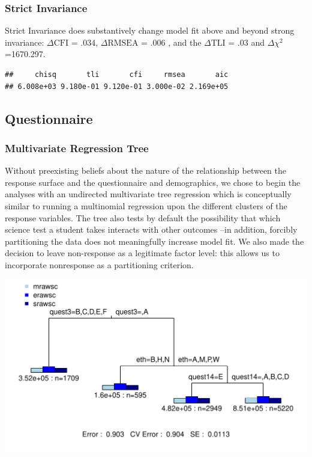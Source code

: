 \documentclass{article}\usepackage[]{graphicx}\usepackage[]{color}
\makeatletter
\def\maxwidth{ %
  \ifdim\Gin@nat@width>\linewidth
    \linewidth
  \else
    \Gin@nat@width
  \fi
}
\newenvironment{kframe}{%
 \def\at@end@of@kframe{}%
 \ifinner\ifhmode%
  \def\at@end@of@kframe{\end{minipage}}%
  \begin{minipage}{\columnwidth}%
 \fi\fi%
 \def\FrameCommand##1{\hskip\@totalleftmargin \hskip-\fboxsep
 \colorbox{shadecolor}{##1}\hskip-\fboxsep
     \hskip-\linewidth \hskip-\@totalleftmargin \hskip\columnwidth}%
 \MakeFramed {\advance\hsize-\width
   \@totalleftmargin\z@ \linewidth\hsize
   \@setminipage}}%
 {\par\unskip\endMakeFramed%
 \at@end@of@kframe}
\newenvironment{knitrout}{}{} %
\makeatother
\begin{document}
\subsubsection{Strict Invariance}
Strict Invariance does substantively change model fit above and beyond strong invariance: $\Delta\mathrm{CFI}$ = .034, $\Delta\mathrm{RMSEA}$ = .006 , and the $\Delta\mathrm{TLI}$ = .03 and $\Delta$$\chi^2$=1670.297. 
\begin{knitrout}
\color{fgcolor}\begin{kframe}
\begin{verbatim}
##     chisq       tli       cfi     rmsea       aic 
## 6.008e+03 9.180e-01 9.120e-01 3.000e-02 2.169e+05
\end{verbatim}
\end{kframe}
\end{knitrout}


\subsection{Questionnaire}
\subsubsection{Multivariate Regression Tree}
Without preexisting beliefs about the nature of the relationship between the response surface and the questionnaire and demographics, we chose to begin the analyses with an undirected multivariate tree regression \cite{De'ath} which is conceptually similar to running a multinomial regression upon the different clusters of the response variables. The tree also tests by default the possibility that which science test a student takes interacts with other outcomes --in addition, forcibly partitioning the data does not meaningfully increase model fit. We also made the decision to leave non-response as a legitimate factor level: this allows us to incorporate nonresponse as a partitioning criterion.

\begin{knitrout}
\color{fgcolor}
\includegraphics[width=\maxwidth]{figure/unnamed-chunk-13} 

\end{knitrout}
\end{document}
